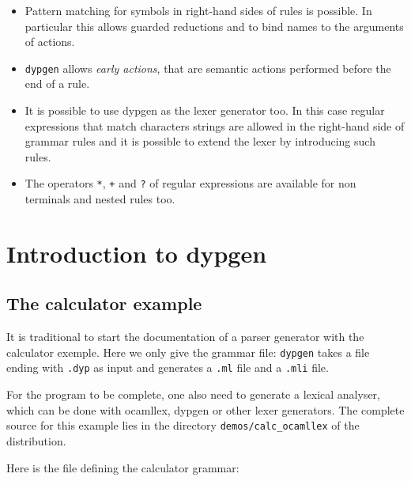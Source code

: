 \documentclass[12pt]{article}
\begin{document}
\begin{itemize}
\item Pattern matching for symbols in right-hand sides of rules is possible.
  In particular this allows guarded reductions and to bind names
  to the arguments of actions.

\item \verb#dypgen# allows {\em early actions}, that are semantic actions
  performed before the end of a rule.

\item It is possible to use dypgen as the lexer generator too. In this case regular expressions that match characters strings are allowed in the right-hand side of grammar rules and it is possible to extend the lexer by introducing such rules.

\item The operators \verb|*|, \verb|+| and \verb|?| of regular expressions are available for non terminals and nested rules too.
\end{itemize} 
\newpage

\tableofcontents

\section{Introduction to dypgen}

\subsection{The calculator example}

It is traditional to start the documentation of a parser generator
with the calculator exemple.  Here we only give the grammar file:
\texttt{dypgen} takes a file ending with \texttt{.dyp} as input and
generates a \texttt{.ml} file and a \texttt{.mli} file.

For the program to be complete, one also need to generate a lexical
analyser, which can be done with ocamllex, dypgen or other lexer generators. The complete source for this example lies in the directory \verb|demos/calc_ocamllex| of the distribution.

Here is the file defining the calculator grammar:
\end{document}
